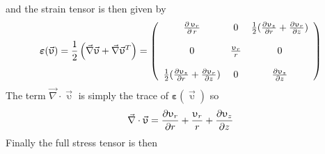 and the strain tensor is then given by 
\begin{equation}
\label{eq:strain_as} 
{\bm \varepsilon}(\vec{\upupsilon})
=\frac12\left(\vec\nabla \vec{\upupsilon}+
\vec\nabla \vec{\upupsilon}^T\right)
=
\left(
\begin{array}{ccc}
{\partial \, \upupsilon_r \over \partial \, r} &
0 &
\frac12({\partial \upupsilon_{z} \over \partial r} 
+ {\partial \upupsilon_r \over \partial z}) \\ \\
0 & {\upupsilon_r \over r} & 0 \\ \\
\frac12({\partial \upupsilon_{z} \over \partial r} + 
{\partial \upupsilon_r \over \partial z} ) & 0 & 
{\partial \upupsilon_{z} \over \partial z} 
\end{array}
\right)
\end{equation}
The term $\vec\nabla \cdot \vec{\upupsilon}$ is simply the trace of ${\bm \varepsilon}(\vec{\upupsilon})$ so 
\[
\vec\nabla \cdot \vec{\upupsilon}
= {\partial \upupsilon_r \over \partial r} 
+{\upupsilon_r \over r}
+{\partial \upupsilon_{z} \over \partial z}
\]
Finally the full stress tensor is then 
